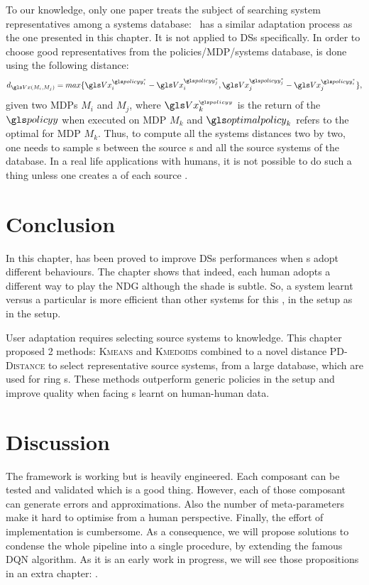 To our knowledge, only one paper treats the subject of searching system representatives among a systems database:~\parencite{mahmud2013} has a similar adaptation process as the one presented in this chapter. It is not applied to \glspl{DS} specifically. In order to choose good representatives from the policies/MDP/systems database,  is done using the following distance:
\begin{equation*}
    d_{\V(M_i,M_j)} = max\{\V_i^{\policy_i^*}-\V_i^{\policy_j^*},\V_j^{\policy_j^*}-\V_j^{\policy_i^*}\},
\end{equation*}
given two \glspl{MDP} $M_i$ and $M_j$, where $\V_k^{_{\policy}}$ is the return of the  $\policy$ when executed on \gls{MDP} $M_k$ and $\optimalpolicy_k$ refers to the optimal  for \gls{MDP} $M_k$. Thus, to compute all the systems distances two by two, one needs to sample s between the source s and all the source systems of the database. In a real life  applications with humans, it is not possible to do such a thing unless one creates a  of each source .

\section{Conclusion}
%

In this chapter,  has been proved to improve \glspl{DS} performances when s adopt different behaviours. The chapter shows that indeed, each human adopts a different way to play the \gls{NDG} although the shade is subtle. So, a system learnt versus a particular  is more efficient than other systems for this , in the  setup as in the  setup.

User adaptation requires selecting source systems to  knowledge. This chapter proposed 2 methods: \textsc{Kmeans} and \textsc{Kmedoids} combined to a novel distance \textsc{PD-Distance} to select representative source systems, from a large database, which are used for ring  s. These methods outperform generic policies in the  setup and improve  quality when facing s learnt on human-human data.

\section{Discussion}

The framework is working but is heavily engineered. Each composant can be tested and validated which is a good thing. However, each of those composant can generate errors and approximations. Also the number of meta-parameters make it hard to optimise from a human perspective. Finally, the effort of implementation is cumbersome. As a consequence, we will propose solutions to condense the whole pipeline into a single procedure, by extending the famous \gls{DQN} algorithm. As it is an early work in progress, we will see those propositions in an extra chapter: .
